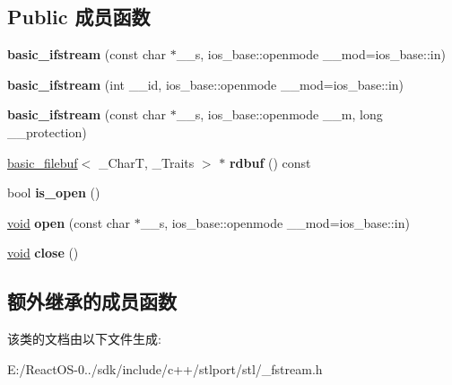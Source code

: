 \subsection*{Public 成员函数}
\begin{DoxyCompactItemize}
\item 
\mbox{\label{classbasic__ifstream_a22223c6207141886e267c62e5bb774d3}} 
{\bfseries basic\+\_\+ifstream} (const char $\ast$\+\_\+\+\_\+s, ios\+\_\+base\+::openmode \+\_\+\+\_\+mod=ios\+\_\+base\+::in)
\item 
\mbox{\label{classbasic__ifstream_a092af388606ae3dee1aaa7deb6590379}} 
{\bfseries basic\+\_\+ifstream} (int \+\_\+\+\_\+id, ios\+\_\+base\+::openmode \+\_\+\+\_\+mod=ios\+\_\+base\+::in)
\item 
\mbox{\label{classbasic__ifstream_ae602cb0de25d5eaf5b3d2b5441452c77}} 
{\bfseries basic\+\_\+ifstream} (const char $\ast$\+\_\+\+\_\+s, ios\+\_\+base\+::openmode \+\_\+\+\_\+m, long \+\_\+\+\_\+protection)
\item 
\mbox{\label{classbasic__ifstream_a6ff856583e5f653968573233cc9174fb}} 
\hyperlink{classbasic__filebuf}{basic\+\_\+filebuf}$<$ \+\_\+\+CharT, \+\_\+\+Traits $>$ $\ast$ {\bfseries rdbuf} () const
\item 
\mbox{\label{classbasic__ifstream_a213d3aa940c44c6f299b361e56649ed6}} 
bool {\bfseries is\+\_\+open} ()
\item 
\mbox{\label{classbasic__ifstream_a48cecfb102f92a5eacaec4e0400b4b61}} 
\hyperlink{interfacevoid}{void} {\bfseries open} (const char $\ast$\+\_\+\+\_\+s, ios\+\_\+base\+::openmode \+\_\+\+\_\+mod=ios\+\_\+base\+::in)
\item 
\mbox{\label{classbasic__ifstream_ae48cae8a876b3b14a1ab5203823a1fee}} 
\hyperlink{interfacevoid}{void} {\bfseries close} ()
\end{DoxyCompactItemize}
\subsection*{额外继承的成员函数}


该类的文档由以下文件生成\+:\begin{DoxyCompactItemize}
\item 
E\+:/\+React\+O\+S-\/0../sdk/include/c++/stlport/stl/\+\_\+fstream.\+h\end{DoxyCompactItemize}
